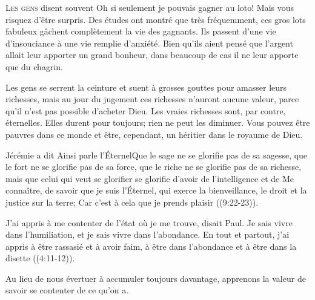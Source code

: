 \lettrine{L}{es gens} disent souvent\frcolon {}
 \Og Oh si seulement je pouvais gagner au loto! \Fg{}
 Mais vous risquez d'être surpris. Des études ont montré
 que très fréquemment, ces gros lots fabuleux gâchent complètement
 la vie des gagnants. Ils passent d'une vie d'insouciance
 à une vie remplie d'anxiété. Bien qu'ils aient pensé
 que l'argent allait leur apporter un grand bonheur,
 dans beaucoup de cas il ne leur apporte que du chagrin.

Les gens se serrent la ceinture et suent à grosses gouttes
 pour amasser leurs richesses, mais au jour du jugement
 ces richesses n'auront aucune valeur, parce qu'il n'est pas possible
 d'acheter Dieu. Les vraies richesses sont, par contre, éternelles.
 Elles durent pour toujours; rien ne peut les diminuer.
 Vous pouvez être pauvres dans ce monde et être, cependant,
 un héritier dans le royaume de Dieu.


Jérémie a dit\frcolon {}
 \Og Ainsi parle l'Éternel\frcolon Que le sage ne se glorifie pas de sa sagesse,
 que le fort ne se glorifie pas de sa force, que le riche ne se glorifie pas
 de sa richesse, mais que celui qui veut se glorifier se glorifie d'avoir
 de l'intelligence et de Me connaître, de savoir que je suis l'Éternel,
 qui exerce la bienveillance, le droit et la justice sur la terre;
 Car c'est à cela que je prends plaisir \Fg{} 
 ((9:22-23)).

\Og J'ai appris à me contenter de l'état où je me trouve, disait Paul.
 Je sais vivre dans l'humiliation, et je sais vivre dans l'abondance.
 En tout et partout, j'ai appris à être rassasié et à avoir faim,
 à être dans l'abondance et à être dans la disette \Fg{} 
 ((4:11-12)).

Au lieu de nous évertuer à accumuler toujours davantage, apprenons la valeur
 de savoir se contenter de ce qu'on a. 

\dvrule





